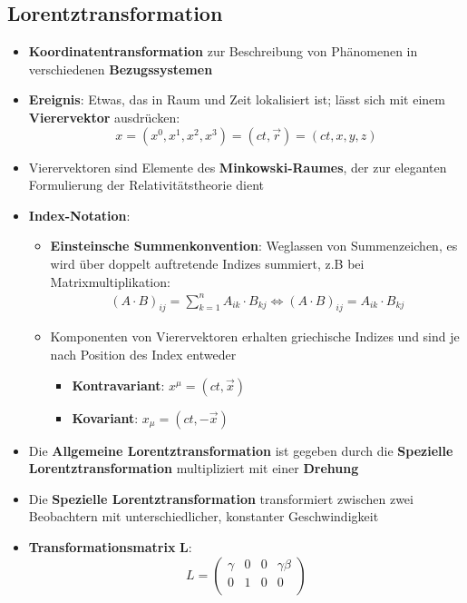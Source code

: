 \newpage
\subsection{Lorentztransformation}%
\label{srel:sub:lorentztransformation}

\begin{itemize}
	\item \textbf{Koordinatentransformation} zur Beschreibung von Phänomenen in verschiedenen \textbf{Bezugssystemen}
	\item \textbf{Ereignis}: Etwas, das in Raum und Zeit lokalisiert ist; lässt sich mit einem \textbf{Vierervektor} ausdrücken:
	$$
		x = (x^0, x^1, x^2, x^3) = (ct, \vec{r}) = (ct, x, y, z)
	$$
	\item Vierervektoren sind Elemente des \textbf{Minkowski-Raumes}, der zur eleganten Formulierung der Relativitätstheorie dient
	\item \textbf{Index-Notation}:
	\begin{itemize}
		\item \textbf{Einsteinsche Summenkonvention}: Weglassen von Summenzeichen, es wird über doppelt auftretende Indizes summiert, z.B bei Matrixmultiplikation:
		\begin{align*}
			(A \cdot B)_{ij} = \sum^n_{k=1}A_{ik} \cdot B_{kj} \Leftrightarrow (A \cdot B)_{ij} = A_{ik} \cdot B_{kj}
		\end{align*}
		\item Komponenten von Vierervektoren erhalten griechische Indizes und sind je nach Position des Index entweder
		\begin{itemize}
			\item \textbf{Kontravariant}: $x^\mu = (ct, \vec{x})$
			\item \textbf{Kovariant}: $x_\mu = (ct, -\vec{x})$
		\end{itemize}
	\end{itemize}
	\item Die \textbf{Allgemeine Lorentztransformation} ist gegeben durch die \textbf{Spezielle Lorentztransformation} multipliziert mit einer \textbf{Drehung}
	\item Die \textbf{Spezielle Lorentztransformation} transformiert zwischen zwei Beobachtern mit unterschiedlicher, konstanter Geschwindigkeit
	\item \textbf{Transformationsmatrix} $\mathbf{L}$:
	$$
		L =
		\begin{pmatrix}
			\gamma & 0 & 0 & \gamma\beta\\
			0 & 1 & 0 & 0\\

\end{pmatrix}$$
\end{itemize}
